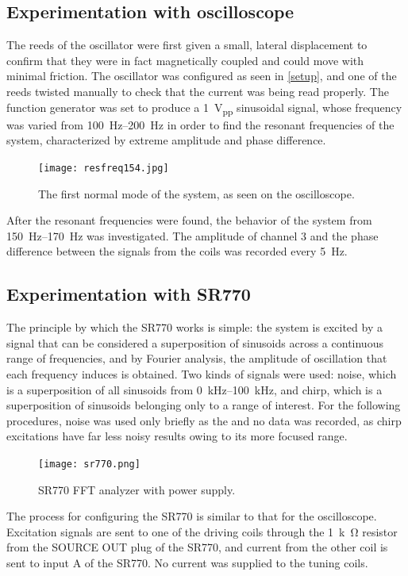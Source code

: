 \documentclass{article}
\begin{document}
\subsection{Experimentation with oscilloscope}
The reeds of the oscillator were first given a small, lateral displacement to confirm that they were in fact magnetically coupled and could move with minimal friction. The oscillator was configured as seen in \autoref{setup}, and one of the reeds twisted manually to check that the current was being read properly. The function generator was set to produce a \qty{1}{V_{pp}} sinusoidal signal, whose frequency was varied from \qtyrange{100}{200}{Hz} in order to find the resonant frequencies of the system, characterized by extreme amplitude and phase difference.
\begin{figure}
  \centering
  \texttt{[image: resfreq154.jpg]}
  \caption{The first normal mode of the system, as seen on the oscilloscope.}
\end{figure}

After the resonant frequencies were found, the behavior of the system from \qtyrange{150}{170}{Hz} was investigated. The amplitude of channel 3 and the phase difference between the signals from the coils was recorded every \qty{5}{Hz}.

\subsection{Experimentation with SR770}
The principle by which the SR770 works is simple: the system is excited by a signal that can be considered a superposition of sinusoids across a continuous range of frequencies, and by Fourier analysis, the amplitude of oscillation that each frequency induces is obtained. Two kinds of signals were used: noise, which is a superposition of all sinusoids from \qtyrange{0}{100}{kHz}, and chirp, which is a superposition of sinusoids belonging only to a range of interest. For the following procedures, noise was used only briefly as the and no data was recorded, as chirp excitations have far less noisy results owing to its more focused range.

\begin{figure}
  \centering
  \texttt{[image: sr770.png]}
  \caption{SR770 FFT analyzer with power supply.}
\end{figure}

The process for configuring the SR770 is similar to that for the oscilloscope. Excitation signals are sent to one of the driving coils through the \qty{1}{k\ohm} resistor from the SOURCE OUT plug of the SR770, and current from the other coil is sent to input A of the SR770. No current was supplied to the tuning coils.
\end{document}
